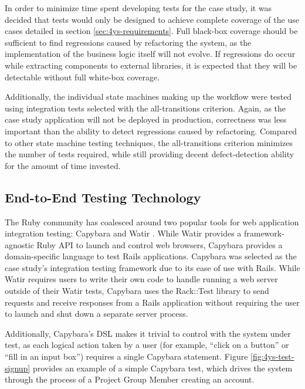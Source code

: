 \documentclass[document.tex]{subfiles}
\begin{document}
In order to minimize time spent developing tests for the case study, it was decided that tests would only be designed to achieve complete coverage of the use cases detailed in section \ref{sec:4ys-requirements}. Full black-box coverage should be sufficient to find regressions caused by refactoring the system, as the implementation of the business logic itself will not evolve. If regressions do occur while extracting components to external libraries, it is expected that they will be detectable without full white-box coverage.

Additionally, the individual state machines making up the workflow were tested using integration tests selected with the all-transitions criterion. Again, as the case study application will not be deployed in production, correctness was less important than the ability to detect regressions caused by refactoring. Compared to other state machine testing techniques, the all-transitions criterion minimizes the number of tests required, while still providing decent defect-detection ability for the amount of time invested.


\subsection {End-to-End Testing Technology}

The Ruby community has coalesced around two popular tools for web application integration testing: Capybara \cite{capybara} and Watir \cite{watir}. While Watir provides a framework-agnostic Ruby API to launch and control web browsers, Capybara provides a domain-specific language to test Rails applications. Capybara was selected as the case study's integration testing framework due to its ease of use with Rails. While Watir requires users to write their own code to handle running a web server outside of their Watir tests, Capybara uses the Rack::Test library to send requests and receive responses from a Rails application without requiring the user to launch and shut down a separate server process.

Additionally, Capybara's DSL makes it trivial to control with the system under test, as each logical action taken by a user (for example, ``click on a button'' or ``fill in an input box'') requires a single Capybara statement. Figure \ref{fig:4ys-test-signup} provides an example of a simple Capybara test, which drives the system through the process of a Project Group Member creating an account.
\end{document}
